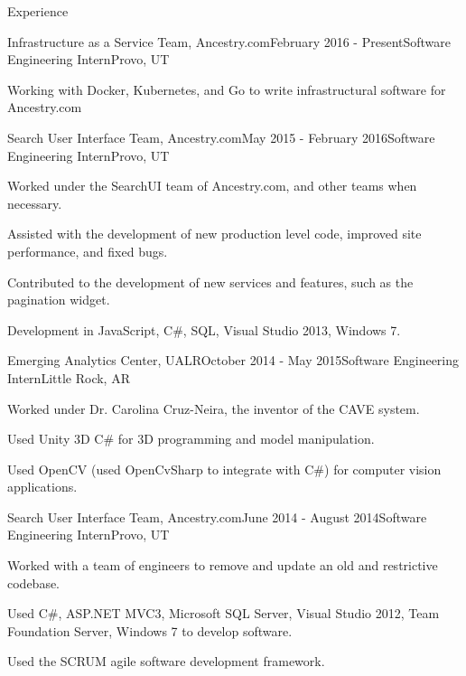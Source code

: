 \documentclass{resume} %
\begin{document}
\begin{rSection}{Experience}

\begin{rSubsection}{Infrastructure as a Service Team, Ancestry.com}{February 2016 - Present}{Software Engineering Intern}{Provo, UT}
  \item Working with Docker, Kubernetes, and Go to write infrastructural software for Ancestry.com
\end{rSubsection}

\begin{rSubsection}{Search User Interface Team, Ancestry.com}{May 2015 - February 2016}{Software Engineering Intern}{Provo, UT}
	\item Worked under the SearchUI team of Ancestry.com, and other teams when necessary.
	\item Assisted with the development of new production level code, improved site performance, and fixed bugs.
	\item Contributed to the development of new services and features, such as the pagination widget.
	\item Development in JavaScript, C\#, SQL, Visual Studio 2013, Windows 7.
\end{rSubsection}

\begin{rSubsection}{Emerging Analytics Center, UALR}{October 2014 - May 2015}{Software Engineering Intern}{Little Rock, AR}
	\item Worked under Dr. Carolina Cruz-Neira, the inventor of the CAVE system.
	\item Used Unity 3D C\# for 3D programming and model manipulation.
	\item Used OpenCV (used OpenCvSharp to integrate with C\#) for computer vision applications.
\end{rSubsection}

\begin{rSubsection}{Search User Interface Team, Ancestry.com}{June 2014 - August 2014}{Software Engineering Intern}{Provo, UT}
	\item Worked with a team of engineers to remove and update an old and restrictive codebase.
	\item Used C\#, ASP.NET MVC3, Microsoft SQL Server, Visual Studio 2012, Team Foundation Server, Windows 7 to develop software.
	\item Used the SCRUM agile software development framework.
\end{rSubsection}

\end{rSection}
\end{document}
